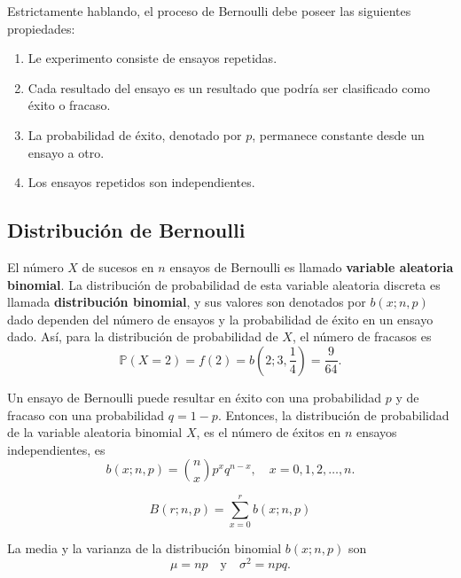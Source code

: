 Estrictamente hablando, el proceso de Bernoulli debe poseer las siguientes propiedades:
\begin{enumerate}
	\item Le experimento consiste de ensayos repetidas.
	\item Cada resultado del ensayo es un resultado que podría ser clasificado como éxito o fracaso.
	\item La probabilidad de éxito, denotado por $p$, permanece constante desde un ensayo a otro.
	\item Los ensayos repetidos son independientes.
\end{enumerate}

\subsection*{Distribución de Bernoulli}

El número $X$ de sucesos en $n$ ensayos de Bernoulli es llamado \textbf{variable aleatoria binomial}. La distribución de probabilidad de esta variable aleatoria discreta es llamada \textbf{distribución binomial}, y sus valores son denotados por $b\left(x;n,p\right)$ dado dependen del número de ensayos y la probabilidad de éxito en un ensayo dado. Así, para la distribución de probabilidad de $X$, el número de fracasos es
\begin{equation*}[]
\mathds{P}\left(X=2\right)=f(2)=b\left(2;3,\frac{1}{4}\right)=\frac{9}{64}.
\end{equation*}

\begin{definition}[]
Un ensayo de Bernoulli puede resultar en éxito con una probabilidad $p$ y de fracaso con una probabilidad $q=1-p$. Entonces, la distribución de probabilidad  de la variable aleatoria binomial $X$, es el número de éxitos en $n$ ensayos independientes, es
\begin{equation*}
b\left(x;n,p\right)=\binom{n}{x}p^{x}q^{n-x},\quad x=0,1,2,\ldots,n.
\end{equation*}
\end{definition}

\begin{equation*}
B\left(r;n,p\right)=\sum_{x=0}^{r}b\left(x;n,p\right)
\end{equation*}

\begin{theorem}[]
La media y la varianza de la distribución binomial $b\left(x;n,p\right)$ son
\begin{equation*}
\mu=np\quad\text{y}\quad\sigma^{2}=npq.
\end{equation*}
\end{theorem}

